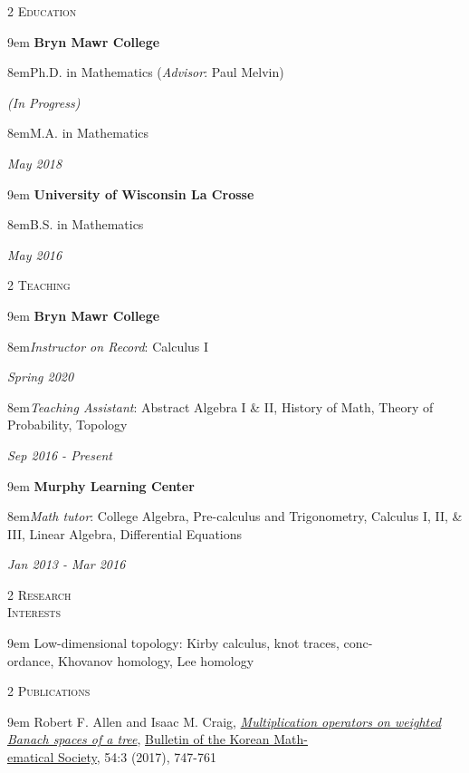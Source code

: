 \documentclass[11pt]{article}
\newcommand{\itemreg}[1]{\begin{addmargin}[0em]{9em} #1 \end{addmargin}}
\newcommand{\iteminddate}[2]{\begin{addmargin}[1.75em]{8em}#1\end{addmargin}\vspace{-1.5em}\hfill\textit{#2}\\ \vspace{.25em}}
\newcommand{\iteminddateext}[2]{\begin{addmargin}[1.75em]{8em}#1\end{addmargin}\vspace{-2.5em}\hfill\textit{#2}\\ \vspace{.25em}}
\begin{document}
\null
\vskip20pt



\begin{multicols}{2}
	\textsc{Education} 
	
	\columnbreak
	
	\itemreg{\textbf{Bryn Mawr College}}
		\iteminddate{Ph.D. in Mathematics (\textit{Advisor}: Paul Melvin)}{(In Progress)}
		\iteminddate{M.A. in Mathematics}{May 2018}
	\vspace{.35em}
	\itemreg{\textbf{University of Wisconsin La Crosse}}
		\iteminddate{B.S. in Mathematics}{May 2016}
\end{multicols}
\vspace{-.5em}



\begin{multicols}{2}
	\textsc{Teaching} 
	
	\columnbreak
	
	\itemreg{\textbf{Bryn Mawr College}}
		\iteminddate{\textit{Instructor on Record}: Calculus I}{Spring 2020}
		\iteminddate{\textit{Teaching Assistant}: Abstract Algebra I \& II, History of Math, Theory of Probability, Topology}{Sep 2016 - Present}
		\vspace{.35em}
	\itemreg{\textbf{Murphy Learning Center}}
		\iteminddateext{\textit{Math tutor}: College Algebra, Pre-calculus and Trigonometry, Calculus I, II, \& III, Linear Algebra, Differential Equations}{Jan 2013 - Mar 2016}
\end{multicols}
\vspace{-.5em}



\begin{multicols}{2}
	\textsc{Research \\ Interests}
	
	\columnbreak
	
	\itemreg{Low-dimensional topology: Kirby calculus, knot traces, conc-\\ordance, Khovanov homology, Lee homology}
\end{multicols}
\vspace{-.5em}



\begin{multicols}{2}
	\textsc{Publications}
	
	\columnbreak
	
	\itemreg{Robert F. Allen and Isaac M. Craig, \textit{\href{http://bkms.kms.or.kr/journal/view.html?multi\%5B\%5D=7656\&tops=\&book=BKMS\&start=0\&scale=50\&authkey=\&keykey=\&key_1=\&titlekey=\&tit_1=\&abskey=\&abs_1=\&msckey=\&msc_1=\&Vol=54\&Num=3\&PG=\&year1=\&year2=\&sort=Regnum-0\&aut_box=Y\&sub_box=Y\&sos_box=\&key_box=\&pub_box=Y\&abs_box=\&mod=vol\&sflag=\&language=\&uid=}{Multiplication operators on weighted Banach spaces of a tree}}, \href{http://bkms.kms.or.kr/}{Bulletin of the Korean Math-\\ematical Society}, 54:3 (2017), 747-761}
\end{multicols}
\vspace{-.5em}
\end{document}
